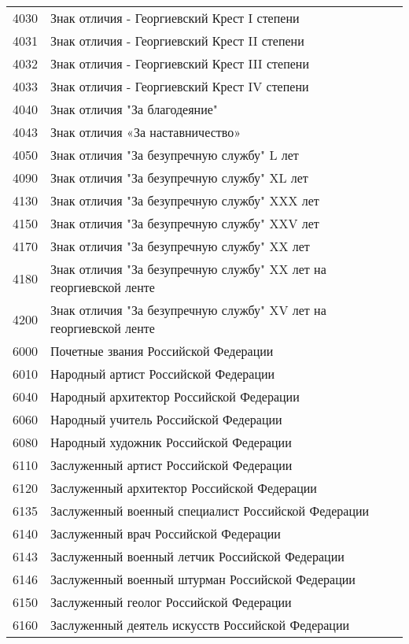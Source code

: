 \documentclass[10pt, a4paper, titlepage]{article}
\begin{document}
\begin{center}
\begin{longtable}{rp{}}
        4030 & Знак отличия - Георгиевский Крест I степени \\
        4031 & Знак отличия - Георгиевский Крест II степени \\
        4032 & Знак отличия - Георгиевский Крест III степени \\
        4033 & Знак отличия - Георгиевский Крест IV степени \\
        4040 & Знак отличия "За благодеяние" \\
        4043 & Знак отличия «За наставничество» \\
        4050 & Знак отличия "За безупречную службу" L лет \\
        4090 & Знак отличия "За безупречную службу" XL лет \\
        4130 & Знак отличия "За безупречную службу" XXX лет \\
        4150 & Знак отличия "За безупречную службу" XXV лет \\
        4170 & Знак отличия "За безупречную службу" XX лет \\
        4180 & Знак отличия "За безупречную службу" XX лет на георгиевской ленте \\
        4200 & Знак отличия "За безупречную службу" XV лет на георгиевской ленте \\
        6000 & Почетные звания Российской Федерации \\
        6010 & Народный артист Российской Федерации \\
        6040 & Народный архитектор Российской Федерации \\
        6060 & Народный учитель Российской Федерации \\
        6080 & Народный художник Российской Федерации \\
        6110 & Заслуженный артист Российской Федерации \\
        6120 & Заслуженный архитектор Российской Федерации \\
        6135 & Заслуженный военный специалист Российской Федерации \\
        6140 & Заслуженный врач Российской Федерации \\
        6143 & Заслуженный военный летчик Российской Федерации \\
        6146 & Заслуженный военный штурман Российской Федерации \\
        6150 & Заслуженный геолог Российской Федерации \\
        6160 & Заслуженный деятель искусств Российской Федерации \\

\end{longtable}
\end{center}
\end{document}

